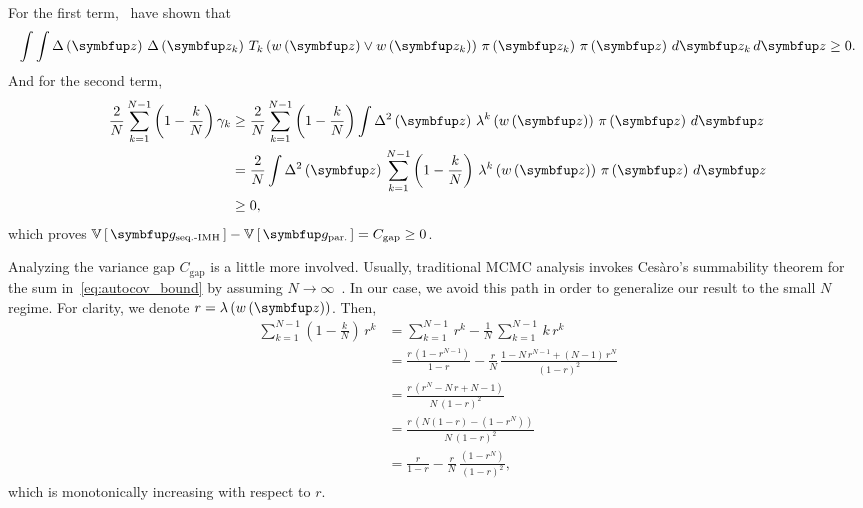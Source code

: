 \begin{proofEnd}
For the first term,~\citet[Theorem 3]{tan_monte_2006} have shown that
\begin{align*}
  \int \int
  \Delta\left(\vz\right) \,
  \Delta\left(\vz_k\right) \,
  T_k\left(w\left(\vz\right) \vee w\left(\vz_k\right) \right) \, \pi\left(\vz_k\right) \, \pi\left(\vz\right)  \, d\vz_k  \, d\vz
  \geq
  0.
\end{align*}
And for the second term,
\begin{align}
  \frac{2}{N} \sum_{k=1}^{N-1} \left(1 - \frac{k}{N}\right) \gamma_k
  &\geq
  \frac{2}{N} \sum_{k=1}^{N-1} \left(1 - \frac{k}{N}\right)
  \int
  \Delta^2\left(\vz\right) \, \lambda^k\left(w\left(\vz\right)\right) \, \pi\left(\vz\right) \, d\vz
  \nonumber
  \\
  &=
  \frac{2}{N}
  \int
  \Delta^2\left(\vz\right) \,
   \sum_{k=1}^{N-1} 
  \left(1 - \frac{k}{N}\right) \, \lambda^k\left(w\left(\vz\right)\right)
  \, \pi\left(\vz\right) \, d\vz \label{eq:autocov_bound}  \\
  &\geq 0,
  \nonumber
\end{align}
which proves \(\V{\vg_{\text{seq.-IMH}}} - \V{\vg_{\text{par.}}} = C_{\text{gap}} \geq 0\).

Analyzing the variance gap \(C_{\text{gap}}\) is a little more involved.
Usually, traditional MCMC analysis invokes Ces\`aro's summability theorem for the sum in~\cref{eq:autocov_bound} by assuming \(N \rightarrow \infty\)~\citep{kung_discussions_1994}.
In our case, we avoid this path in order to generalize our result to the small \(N\) regime.
For clarity, we denote \(r = \lambda\left(w\left(\vz\right)\right)\).
Then,
\begin{align}
 \sum_{k=1}^{N-1} \left(1 - \frac{k}{N}\right) \, r^k
 &=
 \sum_{k=1}^{N-1} \, r^k
 -
 \frac{1}{N}\,\sum_{k=1}^{N-1} \,k\, r^k
  \nonumber
 \\
 &=
 \frac{r \, \left( 1 - r^{N-1} \right) }{1 - r} 
 -
 \frac{r}{N}
 \,
 \frac{1 - N\,r^{N-1} + \left(N-1\right)\,r^{N} }{{\left(1 - r\right)}^2} 
  \nonumber
 \\
 &=
 \frac{
   r\,\left(r^N - N\,r + N - 1\right)
 }{
   N\,{\left(1-r\right)}^2
 }
  \nonumber
 \\
 &=
 \frac{
   r\,\left( N \left(1-r\right) - \left(1-r^N\right) \right)
 }{
   N\,{\left(1-r\right)}^2
 }
 \nonumber
 \\
 &=
 \frac{r}{1-r} -
 \frac{r}{N}\,\frac{\left(1-r^N\right)}{{\left(1-r\right)}^2},\label{eq:r_exact}
\end{align}
which is monotonically increasing with respect to \(r\).


\end{proofEnd}

